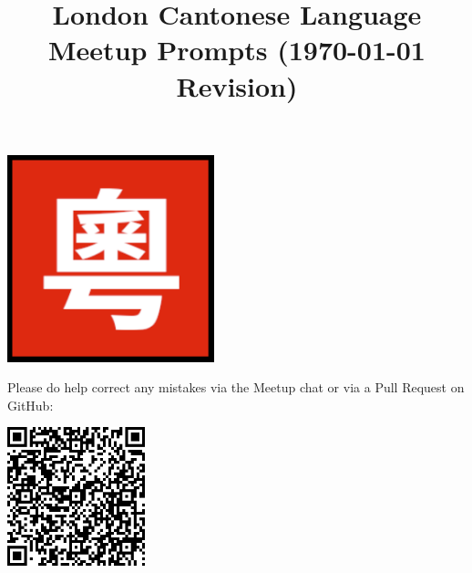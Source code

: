\title{\vspace{-0.5cm}\large\bfseries London Cantonese Language Meetup Prompts (\today{} Revision)}
\author{}
\date{}
\maketitle

\vspace{-2cm}

\begin{center}
  \includegraphics[width=0.45\textwidth]{../assets/logo.png}
\end{center}

Please do help correct any mistakes via the Meetup chat or via a Pull Request on GitHub:

\begin{center}
  \includegraphics[width=0.30\textwidth]{../assets/github.png}
\end{center}

